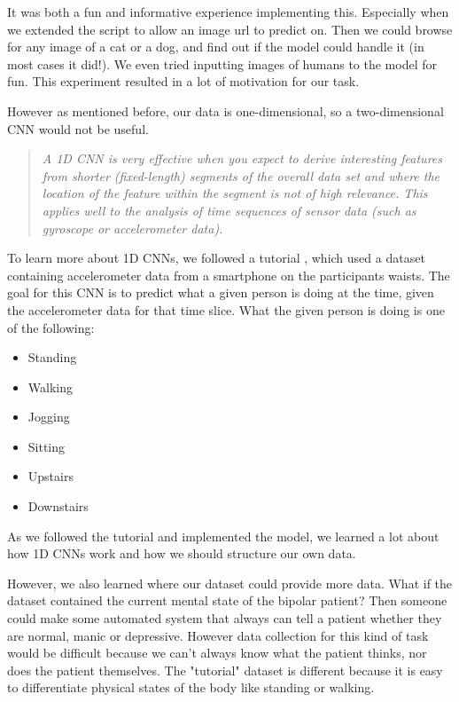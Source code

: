 It was both a fun and informative experience implementing this. Especially when we extended the script to allow an image url to predict on. 
Then we could browse for any image of a cat or a dog, and find out if the model could handle it (in most cases it did!). 
We even tried inputting images of humans to the model for fun. This experiment resulted in a lot of motivation for our task.

However as mentioned before, our data is one-dimensional, so a two-dimensional CNN would not be useful.

\begin{quote}
  \textit{A 1D CNN is very effective when you expect to derive interesting features from shorter (fixed-length) segments of the overall data set 
  and where the location of the feature within the segment is not of high relevance. This applies well to the analysis of time sequences of sensor data 
  (such as gyroscope or accelerometer data).} \cite{1d_cnn}
\end{quote}

To learn more about 1D CNNs, we followed a tutorial \cite{1d_cnn}, which used a dataset containing 
accelerometer data from a smartphone on the participants waists. The goal for this CNN is to predict what a given person is doing 
at the time, given the accelerometer data for that time slice. What the given person is doing is one of the following:
\begin{itemize}
  \item Standing
  \item Walking
  \item Jogging
  \item Sitting
  \item Upstairs
  \item Downstairs
\end{itemize}

As we followed the tutorial and implemented the model, we learned a lot about how 1D CNNs work and how we should structure our own data. 

However, we also learned where our dataset could provide more data. 
What if the dataset contained the current mental state of the bipolar patient? Then someone could make some automated system that always can tell a patient 
whether they are normal, manic or depressive. However data collection for this kind of task would be difficult because we can't always know what the
patient thinks, nor does the patient themselves. The "tutorial" dataset is different because it is easy to differentiate physical states of the body
like standing or walking.

